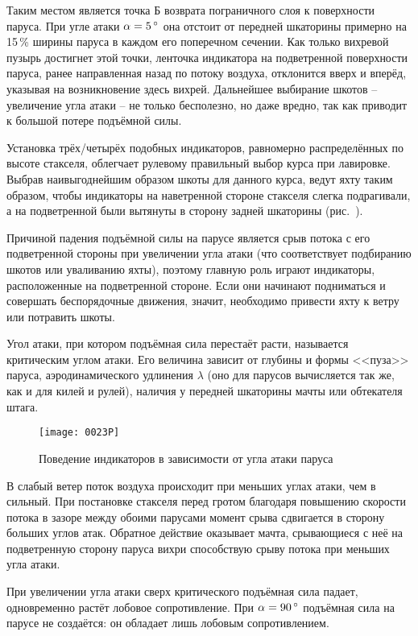 Таким местом является точка Б возврата пограничного слоя к поверхности паруса. При угле атаки $\alpha = 5\,^\circ$ она отстоит от передней шкаторины примерно на 15\,\% ширины паруса в каждом его поперечном сечении. Как только вихревой пузырь достигнет этой точки, ленточка индикатора на подветренной поверхности паруса, ранее направленная назад по потоку воздуха, отклонится вверх и вперёд, указывая на возникновение здесь вихрей. Дальнейшее выбирание шкотов \--- увеличение угла атаки \--- не только бесполезно, но даже вредно, так как приводит к большой потере подъёмной силы.

Установка трёх\-/четырёх подобных индикаторов, равномерно распределённых по высоте стакселя, облегчает рулевому правильный выбор курса при лавировке. Выбрав наивыгоднейшим образом шкоты для данного курса, ведут яхту таким образом, чтобы индикаторы на наветренной стороне стакселя слегка подрагивали, а на подветренной были вытянуты в сторону задней шкаторины (рис.~).
 
Причиной падения подъёмной силы на парусе является срыв потока с его подветренной стороны при увеличении угла атаки (что соответствует подбиранию шкотов или уваливанию яхты), поэтому главную роль играют индикаторы, расположенные на подветренной стороне. Если они начинают подниматься и совершать беспорядочные движения, значит, необходимо привести яхту к ветру или потравить шкоты.

Угол атаки, при котором подъёмная сила перестаёт расти, называется критическим углом атаки. Его величина зависит от глубины и формы <<пуза>> паруса, аэродинамического удлинения $\lambda$ (оно для парусов вычисляется так же, как и для килей и рулей), наличия у передней шкаторины мачты или обтекателя штага.

\begin{figure*}[htb]
  \centering
  \texttt{[image: 0023P]}
  \caption{Поведение индикаторов в зависимости от угла атаки паруса}
  \label{fig:23}
\end{figure*}

В слабый ветер поток воздуха происходит при меньших углах атаки, чем в сильный. При постановке стакселя перед гротом благодаря повышению скорости потока в зазоре между обоими парусами момент срыва сдвигается в сторону больших углов атак. Обратное действие оказывает мачта, срывающиеся с неё на подветренную сторону паруса вихри способствую срыву потока при меньших угла атаки. 

При увеличении угла атаки сверх критического подъёмная сила падает, одновременно растёт лобовое сопротивление. При $\alpha = 90\,^\circ$ подъёмная сила на парусе не создаётся: он обладает лишь лобовым сопротивлением.

